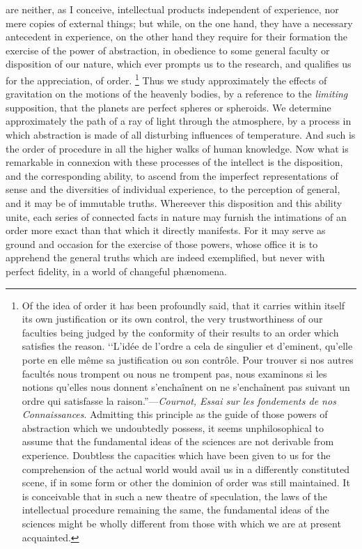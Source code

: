 \documentclass[oneside]{book}
\begin{document}
 are neither, as I conceive,
intellectual products independent of experience, nor mere copies
of external things; but while, on the one hand, they have a necessary
antecedent in experience, on the other hand they require
for their formation the exercise of the power of abstraction, in
obedience to some general faculty or disposition of our nature,
which ever prompts us to the research, and qualifies us for the
appreciation, of order.%
\footnote{Of the idea of order it has been profoundly said, that it carries within itself
its own justification or its own control, the very trustworthiness of our faculties
being judged by the conformity of their results to an order which satisfies the
reason. \lq\lq L'id\'ee de l'ordre a cela de singulier et d'eminent, qu'elle porte en elle
m\^eme sa justification ou son contr\^ole. Pour trouver si nos autres facult\'es nous
trompent ou nous ne trompent pas, nous examinons si les notions qu'elles nous
donnent s'encha\^inent on ne s'encha\^inent pas suivant un ordre qui satisfasse la
raison.''---\textit{Cournot, Essai sur les fondements de nos Connaissances}.
Admitting this principle as the guide of those powers of abstraction which we undoubtedly
possess, it seems unphilosophical to assume that the fundamental ideas of the
sciences are not derivable from experience. Doubtless the capacities which
have been given to us for the comprehension of the actual world would avail us
in a differently constituted scene, if in some form or other the dominion of
order was still maintained. It is conceivable that in such a new theatre
of speculation, the laws of the intellectual procedure remaining the same,
the fundamental ideas of the sciences might be wholly different from those
with which we are at present acquainted.
}%
 Thus we study approximately the effects
of gravitation on the motions of the heavenly bodies, by a reference
to the \emph{limiting} supposition, that the planets are perfect
spheres or spheroids. We determine approximately the path
of a ray of light through the atmosphere, by a process in which
abstraction is made of all disturbing influences of temperature.
And such is the order of procedure in all the higher walks of
human knowledge. Now what is remarkable in connexion with
these processes of the intellect is the disposition, and the corresponding ability, to ascend from the imperfect representations
of sense and the diversities of individual experience, to the perception of general, and it may be of immutable truths. Whereever this disposition and this ability unite, each series of connected facts in nature may furnish the intimations of an order
more exact than that which it directly manifests. For it may
serve as ground and occasion for the exercise of those powers,
whose office it is to apprehend the general truths which are indeed exemplified, but never with perfect fidelity, in a world of
changeful ph{\ae}nomena.
\end{document}
